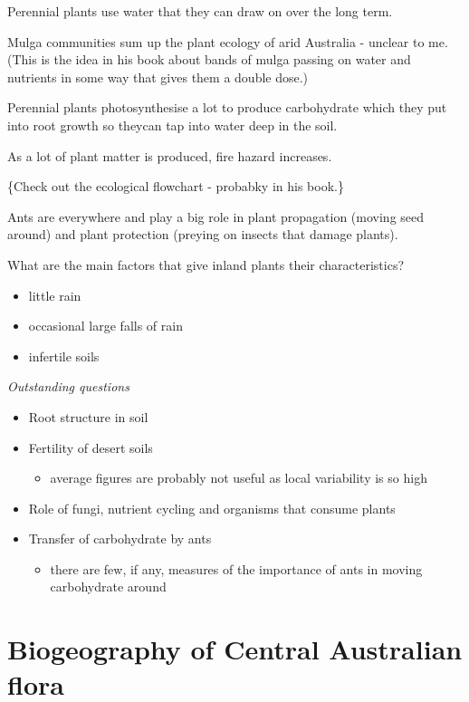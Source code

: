 \documentclass[
]{article}
\providecommand{\tightlist}{%
  \setlength{\itemsep}{0pt}\setlength{\parskip}{0pt}}
\begin{document}
Perennial plants use water that they can draw on over the long term.

Mulga communities sum up the plant ecology of arid Australia - unclear
to me. (This is the idea in his book about bands of mulga passing on
water and nutrients in some way that gives them a double dose.)

Perennial plants photosynthesise a lot to produce carbohydrate which
they put into root growth so theycan tap into water deep in the soil.

As a lot of plant matter is produced, fire hazard increases.

\{Check out the ecological flowchart - probabky in his book.\}

Ants are everywhere and play a big role in plant propagation (moving
seed around) and plant protection (preying on insects that damage
plants).

What are the main factors that give inland plants their characteristics?

\begin{itemize}
\tightlist
\item
  little rain
\item
  occasional large falls of rain
\item
  infertile soils
\end{itemize}

\emph{Outstanding questions}

\begin{itemize}
\tightlist
\item
  Root structure in soil
\item
  Fertility of desert soils

  \begin{itemize}
  \tightlist
  \item
    average figures are probably not useful as local variability is so
    high
  \end{itemize}
\item
  Role of fungi, nutrient cycling and organisms that consume plants
\item
  Transfer of carbohydrate by ants

  \begin{itemize}
  \tightlist
  \item
    there are few, if any, measures of the importance of ants in moving
    carbohydrate around
  \end{itemize}
\end{itemize}

\section{Biogeography of Central Australian
flora}\label{biogeography-of-central-australian-flora}
\end{document}
